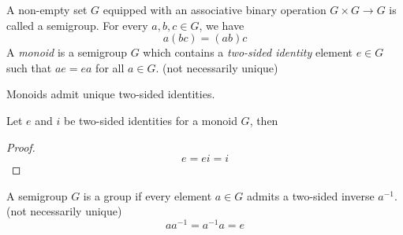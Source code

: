 \documentclass[../main-v2-manifolds.tex]{subfiles}
\begin{document}
\newpage


\begin{definition}\label{hungerford-chp1:semigroups-monoids-definition}
    A non-empty set $G$ equipped with an associative binary operation $G\times G\to G$ is called a semigroup. For every $a,b,c\in G$, we have
    \begin{equation}\label{hungerford-chp1:associativity-semigroup}
        a(bc) = (ab)c 
    \end{equation}
    A \emph{monoid} is a semigroup $G$ which contains a \emph{two-sided identity} element $e\in G$ such that $ae = ea$ for all $a\in G$. (not necessarily unique)
\end{definition}

Monoids admit unique two-sided identities.
\begin{lemma}\label{hungerford-chp1:monoid-unique-identity}
    Let $e$ and $i$ be two-sided identities for a monoid $G$, then
    \begin{proof}
    \[
        e = ei = i
    \]    
    \end{proof}
\end{lemma}
    



\begin{definition}[Group]\label{hungerford-chp1:group-definition}
    A semigroup $G$ is a group if every element $a\in G$ admits a two-sided inverse $a^{-1}$. (not necessarily unique)
    \[
        aa^{-1} = a^{-1}a = e
    \]
\end{definition}
\end{document}
